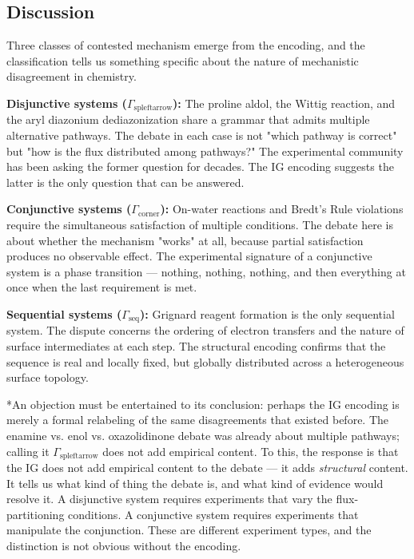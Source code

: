 \documentclass[12pt,a4paper]{article}
\begin{document}
\subsection{Discussion}

Three classes of contested mechanism emerge from the encoding, and the classification tells us something specific about the nature of mechanistic disagreement in chemistry.

\textbf{Disjunctive systems ($\Gamma_{\text{spleftarrow}}$):} The proline aldol, the Wittig reaction, and the aryl diazonium dediazonization share a grammar that admits multiple alternative pathways. The debate in each case is not "which pathway is correct" but "how is the flux distributed among pathways?" The experimental community has been asking the former question for decades. The IG encoding suggests the latter is the only question that can be answered.

\textbf{Conjunctive systems ($\Gamma_{\text{corner}}$):} On-water reactions and Bredt's Rule violations require the simultaneous satisfaction of multiple conditions. The debate here is about whether the mechanism "works" at all, because partial satisfaction produces no observable effect. The experimental signature of a conjunctive system is a phase transition --- nothing, nothing, nothing, and then everything at once when the last requirement is met.

\textbf{Sequential systems ($\Gamma_\textrm{seq}$):} Grignard reagent formation is the only sequential system. The dispute concerns the ordering of electron transfers and the nature of surface intermediates at each step. The structural encoding confirms that the sequence is real and locally fixed, but globally distributed across a heterogeneous surface topology.

*An objection must be entertained to its conclusion: perhaps the IG encoding is merely a formal relabeling of the same disagreements that existed before. The enamine vs. enol vs. oxazolidinone debate was already about multiple pathways; calling it $\Gamma_{\text{spleftarrow}}$ does not add empirical content. To this, the response is that the IG does not add empirical content to the debate --- it adds \emph{structural} content. It tells us what kind of thing the debate is, and what kind of evidence would resolve it. A disjunctive system requires experiments that vary the flux-partitioning conditions. A conjunctive system requires experiments that manipulate the conjunction. These are different experiment types, and the distinction is not obvious without the encoding.
\end{document}
